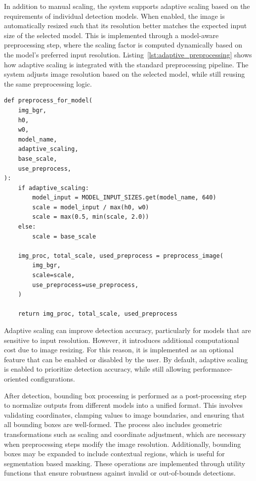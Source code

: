In addition to manual scaling, the system supports adaptive scaling based on the requirements of individual detection models. When enabled, the image is automatically resized such that its resolution better matches the expected input size of the selected model. This is implemented through a model-aware preprocessing step, where the scaling factor is computed dynamically based on the model’s preferred input resolution. Listing~\ref{lst:adaptive_preprocessing} shows how adaptive scaling is integrated with the standard preprocessing pipeline. The system adjusts image resolution based on the selected model, while still reusing the same preprocessing logic.

\begin{lstlisting}[caption={Model-aware preprocessing with adaptive scaling}, label={lst:adaptive_preprocessing}]
def preprocess_for_model(
    img_bgr,
    h0,
    w0,
    model_name,
    adaptive_scaling,
    base_scale,
    use_preprocess,
):
    if adaptive_scaling:
        model_input = MODEL_INPUT_SIZES.get(model_name, 640)
        scale = model_input / max(h0, w0)
        scale = max(0.5, min(scale, 2.0))
    else:
        scale = base_scale

    img_proc, total_scale, used_preprocess = preprocess_image(
        img_bgr,
        scale=scale,
        use_preprocess=use_preprocess,
    )

    return img_proc, total_scale, used_preprocess
\end{lstlisting}

Adaptive scaling can improve detection accuracy, particularly for models that are sensitive to input resolution. However, it introduces additional computational cost due to image resizing. For this reason, it is implemented as an optional feature that can be enabled or disabled by the user. By default, adaptive scaling is enabled to prioritize detection accuracy, while still allowing performance-oriented configurations.

\label{subsec:post_processing}

After detection, \gls{bounding box} processing is performed as a post-processing step to normalize outputs from different models into a unified format. This involves validating coordinates, clamping values to image boundaries, and ensuring that all \gls{bounding box}es are well-formed. The process also includes geometric transformations such as scaling and coordinate adjustment, which are necessary when preprocessing steps modify the image resolution. Additionally, \gls{bounding box}es may be expanded to include contextual regions, which is useful for \gls{segmentation} based \gls{masking}. These operations are implemented through utility functions that ensure robustness against invalid or out-of-bounds detections.

